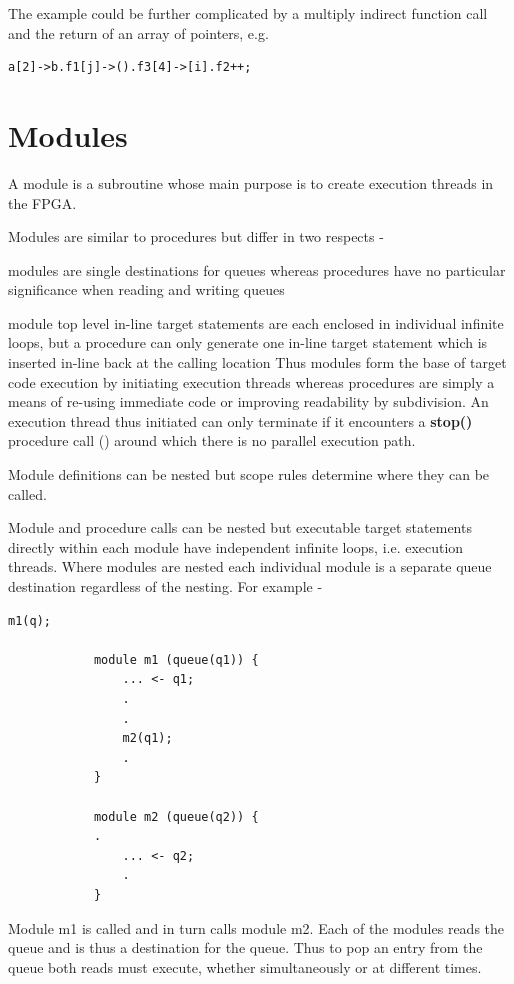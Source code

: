         The example could be further complicated by a multiply indirect
        function call and the return of an array of pointers, e.g.
        \begin{lstlisting}[gobble=8, language=threepl]
           a[2]->b.f1[j]->().f3[4]->[i].f2++;
        \end{lstlisting}        
        







    \section{Modules}\label{sec:modules}

        A module is a subroutine whose main purpose is to create execution
        threads in the FPGA.
        
        Modules are similar to procedures but differ in two respects -
        \blist
        \item   modules are single destinations for queues
                whereas procedures have no particular significance when
                reading and writing queues
        \item   module top level in-line target statements are each enclosed
                in individual infinite loops, but a procedure can only
                generate one in-line target statement which is inserted
                in-line back at the calling location
        \blend
        Thus modules form the base of target code execution by initiating
        execution threads whereas procedures are simply a means of re-using
        immediate code or improving readability by subdivision. An execution
        thread thus initiated can only terminate if it encounters a {\bf stop()}
        procedure call () around which there is no parallel
        execution path.
        
        Module definitions can be nested but scope rules determine where they can
        be called.

        Module and procedure calls can be nested but executable target statements
        directly within each module have independent infinite loops, i.e.
        execution threads. Where modules are nested each individual module is
        a separate queue destination regardless of the nesting. For example -
        
        \begin{lstlisting}[gobble=8, language=threepl]
            m1(q);
            
            module m1 (queue(q1)) {
                ... <- q1;
                .
                .
                m2(q1);
                .
            }
            
            module m2 (queue(q2)) {
            .
                ... <- q2;
                .
            }
        \end{lstlisting}
        Module m1 is called and in turn calls module m2. Each of the modules
        reads the queue and is thus a destination for the queue. Thus to pop
        an entry from the queue both reads must execute, whether simultaneously
        or at different times.


